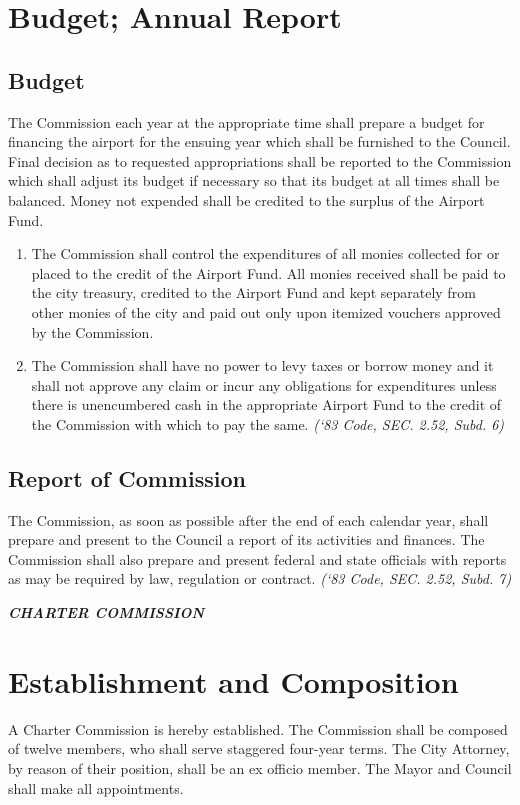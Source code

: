 \section{Budget; Annual Report}
\subsection{Budget}
The Commission each year at the appropriate time shall prepare a budget for financing the airport for the ensuing year which shall be furnished to the Council.  Final decision as to requested appropriations shall be reported to the Commission which shall adjust its budget if necessary so that its budget at all times shall be balanced.  Money not expended shall be credited to the surplus of the Airport Fund.
\begin{enumerate}
\item The Commission shall control the expenditures of all monies collected for or placed to the credit of the Airport Fund.  All monies received shall be paid to the city treasury, credited to the Airport Fund and kept separately from other monies of the city and paid out only upon itemized vouchers approved by the Commission.
\item The Commission shall have no power to levy taxes or borrow money and it shall not approve any claim or incur any obligations for expenditures unless there is unencumbered cash in the appropriate Airport Fund to the credit of the Commission with which to pay the same.\newline
\emph{(‘83 Code, SEC. 2.52, Subd. 6)}
\end{enumerate}
\subsection{Report of Commission}
The Commission, as soon as possible after the end of each calendar year, shall prepare and present to the Council a report of its activities and finances.  The Commission shall also prepare and present federal and state officials with reports as may be required by law, regulation or contract.\newline 
\emph{(‘83 Code, SEC. 2.52, Subd. 7)}\newline

\centerline{\textbf{\emph{\LARGE{CHARTER COMMISSION}}}}
\setcounter{section}{109}
\section{Establishment and Composition}
A Charter Commission is hereby established. The Commission shall be composed of twelve members, who shall serve staggered four-year terms.  The City Attorney, by reason of their position, shall be an ex officio member. The Mayor and Council shall make all appointments.
